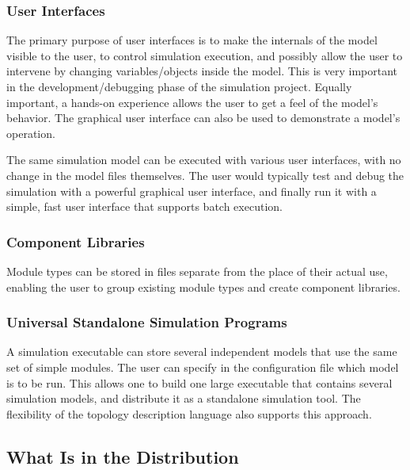 \subsubsection{User Interfaces}
\label{sec:overview:user-interfaces}

The primary purpose of user interfaces is to make the internals
of the model visible to the user, to control simulation execution,
and possibly allow the user to intervene by changing variables/objects
inside the model. This is very important in the development/debugging
phase of the simulation project. Equally important, a hands-on
experience allows the user to get a feel of the model's
behavior. The graphical user interface can also be used to
demonstrate a model's operation.


The same simulation model can be executed with various user
interfaces, with no change in the model files themselves.
The user would typically test and debug the simulation with a powerful
graphical user interface, and finally run it with a simple,
fast user interface that supports batch execution.


\subsubsection{Component Libraries}
\label{sec:overview:component-libraries}

Module types can be stored in files separate from the place
of their actual use, enabling the user to group existing
module types and create component libraries.


\subsubsection{Universal Standalone Simulation Programs}
\label{sec:overview:universal-standalone-simulation-programs}


A simulation executable can store several independent models
that use the same set of simple modules. The user can specify
in the configuration file which model is to be run. This
allows one to build one large executable that contains several
simulation models, and distribute it as a standalone simulation
tool. The flexibility of the topology description language also
supports this approach.


\subsection{What Is in the Distribution}
\label{sec:overview:what-is-in-distribution}

